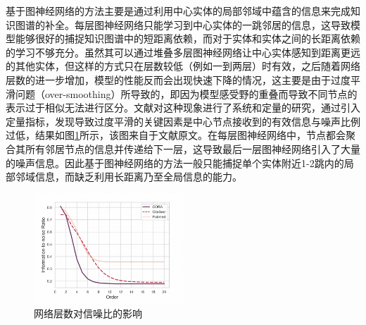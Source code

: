 基于图神经网络的方法主要是通过利用中心实体的局部邻域中蕴含的信息来完成知识图谱的补全。每层图神经网络只能学习到中心实体的一跳邻居的信息，这导致模型能够很好的捕捉知识图谱中的短距离依赖，而对于实体和实体之间的长距离依赖的学习不够充分。虽然其可以通过堆叠多层图神经网络让中心实体感知到距离更远的其他实体，但这样的方式只在层数较低（例如一到两层）时有效，之后随着网络层数的进一步增加，模型的性能反而会出现快速下降的情况，这主要是由于过度平滑问题（over-smoothing）所导致的，即因为模型感受野的重叠而导致不同节点的表示过于相似无法进行区分。文献\cite{over-smoothing}对这种现象进行了系统和定量的研究，通过引入定量指标，发现导致过度平滑的关键因素是中心节点接收到的有效信息与噪声比例过低，结果如图\ref{information-noise}所示，该图来自于文献\cite{over-smoothing}原文。在每层图神经网络中，节点都会聚合其所有邻居节点的信息并传递给下一层，这导致最后一层图神经网络引入了大量的噪声信息。因此基于图神经网络的方法一般只能捕捉单个实体附近1-2跳内的局部邻域信息，而缺乏利用长距离乃至全局信息的能力。
\begin{figure}[htb]
  \centerline{\includegraphics[width=0.5\textwidth]{pic/information-noise.png}}
  \caption{网络层数对信噪比的影响}
  \label{information-noise}
\end{figure}

